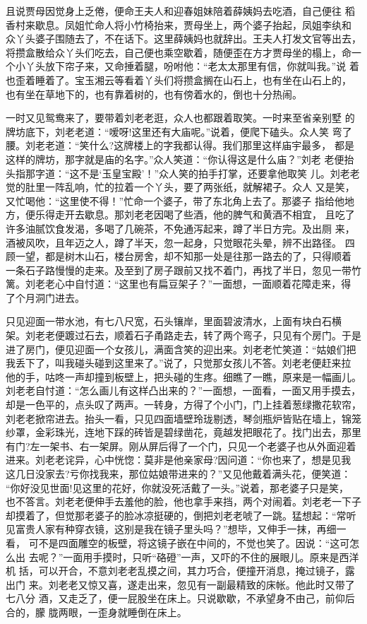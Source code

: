 且说贾母因觉身上乏倦，便命王夫人和迎春姐妹陪着薛姨妈去吃酒，自己便往
稻香村来歇息。凤姐忙命人将小竹椅抬来，贾母坐上，两个婆子抬起，凤姐李纨和
众丫头婆子围随去了，不在话下。这里薛姨妈也就辞出。王夫人打发文官等出去，
将攒盒散给众丫头们吃去，自己便也乘空歇着，随便歪在方才贾母坐的榻上，命一
个小丫头放下帘子来，又命捶着腿，吩咐他：“老太太那里有信，你就叫我。”说
着也歪着睡着了。宝玉湘云等看着丫头们将攒盒搁在山石上，也有坐在山石上的，
也有坐在草地下的，也有靠着树的，也有傍着水的，倒也十分热闹。

一时又见鸳鸯来了，要带着刘老老逛，众人也都跟着取笑。一时来至省亲别墅
的牌坊底下，刘老老道：“嗳呀!这里还有大庙呢。”说着，便爬下磕头。众人笑
弯了腰。刘老老道：“笑什么?这牌楼上的字我都认得。我们那里这样庙宇最多，
都是这样的牌坊，那字就是庙的名字。”众人笑道：“你认得这是什么庙？”刘老
老便抬头指那字道：“这不是‘玉皇宝殿’！”众人笑的拍手打掌，还要拿他取笑
儿。刘老老觉的肚里一阵乱响，忙的拉着一个丫头，要了两张纸，就解裙子。众人
又是笑，又忙喝他：“这里使不得！”忙命一个婆子，带了东北角上去了。那婆子
指给他地方，便乐得走开去歇息。那刘老老因喝了些酒，他的脾气和黄酒不相宜，
且吃了许多油腻饮食发渴，多喝了几碗茶，不免通泻起来，蹲了半日方完。及出厕
来，酒被风吹，且年迈之人，蹲了半天，忽一起身，只觉眼花头晕，辨不出路径。
四顾一望，都是树木山石，楼台房舍，却不知那一处是往那一路去的了，只得顺着
一条石子路慢慢的走来。及至到了房子跟前又找不着门，再找了半日，忽见一带竹
篱。刘老老心中自忖道：“这里也有扁豆架子？”一面想，一面顺着花障走来，得
了个月洞门进去。

只见迎面一带水池，有七八尺宽，石头镶岸，里面碧波清水，上面有块白石横
架。刘老老便踱过石去，顺着石子甬路走去，转了两个弯子，只见有个房门。于是
进了房门，便见迎面一个女孩儿，满面含笑的迎出来。刘老老忙笑道：“姑娘们把
我丢下了，叫我碰头碰到这里来了。”说了，只觉那女孩儿不答。刘老老便赶来拉
他的手，咕咚一声却撞到板壁上，把头碰的生疼。细瞧了一瞧，原来是一幅画儿。
刘老老自忖道：“怎么画儿有这样凸出来的？”一面想，一面看，一面又用手摸去，
却是一色平的，点头叹了两声。一转身，方得了个小门，门上挂着葱绿撒花软帘，
刘老老掀帘进去。抬头一看，只见四面墙壁玲珑剔透，琴剑瓶炉皆贴在墙上，锦笼
纱罩，金彩珠光，连地下踩的砖皆是碧绿凿花，竟越发把眼花了。找门出去，那里
有门?左一架书、右一架屏。刚从屏后得了一个门，只见一个老婆子也从外面迎着
进来。刘老老诧异，心中恍惚：莫非是他亲家母?因问道：“你也来了，想是见我
这几日没家去?亏你找我来，那位姑娘带进来的？”又见他戴着满头花，便笑道：
“你好没见世面!见这里的花好，你就没死活戴了一头。”说着，那老婆子只是笑，
也不答言。刘老老便伸手去羞他的脸，他也拿手来挡，两个对闹着。刘老老一下子
却摸着了，但觉那老婆子的脸冰凉挺硬的，倒把刘老老唬了一跳。猛想起：“常听
见富贵人家有种穿衣镜，这别是我在镜子里头吗？”想毕，又伸手一抹，再细一看，
可不是四面雕空的板壁，将这镜子嵌在中间的，不觉也笑了。因说：“这可怎么出
去呢？”一面用手摸时，只听“硌磴”一声，又吓的不住的展眼儿。原来是西洋机
括，可以开合，不意刘老老乱摸之间，其力巧合，便撞开消息，掩过镜子，露出门
来。刘老老又惊又喜，遂走出来，忽见有一副最精致的床帐。他此时又带了七八分
酒，又走乏了，便一屁股坐在床上。只说歇歇，不承望身不由己，前仰后合的，朦
胧两眼，一歪身就睡倒在床上。

